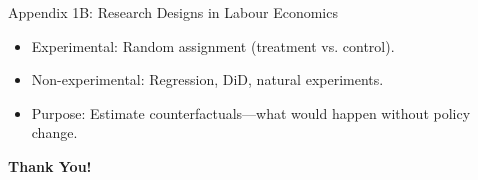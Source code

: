 \documentclass[aspectratio=169]{beamer}
\begin{document}
\begin{frame}{Appendix 1B: Research Designs in Labour Economics}
\begin{itemize}
  \item Experimental: Random assignment (treatment vs. control).
  \item Non-experimental: Regression, DiD, natural experiments.
  \item Purpose: Estimate counterfactuals—what would happen without policy change.
\end{itemize}
\end{frame}

\begin{frame}
\centering
\Huge{\textbf{Thank You!}} \\

\end{frame}
\end{document}
